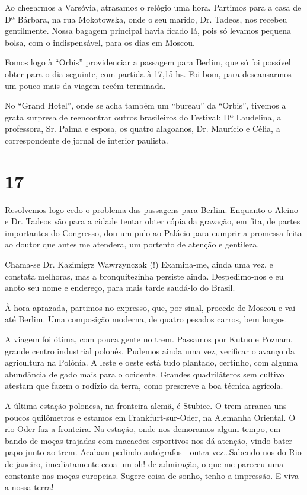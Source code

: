 Ao chegarmos a Varsóvia, atrasamos o relógio uma hora. Partimos para a casa de Dª Bárbara, na rua Mokotowska, onde o seu marido, Dr. Tadeos, nos recebeu gentilmente. Nossa bagagem principal havia ficado lá, pois só levamos pequena bolsa, com o indispensável, para os dias em Moscou.

Fomos logo à “Orbis” providenciar a passagem para Berlim, que só foi possível obter para o dia seguinte, com partida à 17,15 hs. Foi bom, para descansarmos um pouco mais da viagem recém-terminada.

No “Grand Hotel”, onde se acha também um “bureau” da “Orbis”, tivemos a grata surpresa de reencontrar outros brasileiros do Festival: Dª Laudelina, a professora, Sr. Palma e esposa, os quatro alagoanos, Dr. Maurício e Célia, a correspondente de jornal de interior paulista.

\section*{17 \adfflatleafright {}}
Resolvemos logo cedo o problema das passagens para Berlim. Enquanto o Alcino e Dr. Tadeos vão para a cidade tentar obter cópia da gravação, em fita, de partes importantes do Congresso, dou um pulo ao Palácio para cumprir a promessa feita ao doutor que antes me atendera, um portento de atenção e gentileza.

Chama-se Dr. Kazimigrz Wawrzynczak (!) Examina-me, ainda uma vez, e constata melhoras, mas a bronquitezinha persiste ainda. Despedimo-nos e eu anoto seu nome e endereço, para mais tarde saudá-lo do Brasil.

À hora aprazada, partimos no expresso, que, por sinal, procede de Moscou e vai até Berlim. Uma composição moderna, de quatro pesados carros, bem longos.

A viagem foi ótima, com pouca gente no trem. Passamos por Kutno e Poznam, grande centro industrial polonês. Pudemos ainda uma vez, verificar o avanço da agricultura na Polônia. A leste e oeste está tudo plantado, certinho, com alguma abundância de gado mais para o ocidente. Grandes quadriláteros sem cultivo atestam que fazem o rodízio da terra, como prescreve a boa técnica agrícola.

A última estação polonesa, na fronteira alemã, é Stubice. O trem arranca uns poucos quilômetros e estamos em Frankfurt-sur-Oder, na Alemanha Oriental. O rio Oder faz a fronteira. Na estação, onde nos demoramos algum tempo, em bando de moças trajadas com macacões esportivos nos dá atenção, vindo bater papo junto ao trem. Acabam pedindo autógrafos - outra vez\ldots Sabendo-nos do Rio de janeiro, imediatamente ecoa um oh! de admiração, o que me pareceu uma constante nas moças europeias. Sugere coisa de sonho, tenho a impressão. E viva a nossa terra!

